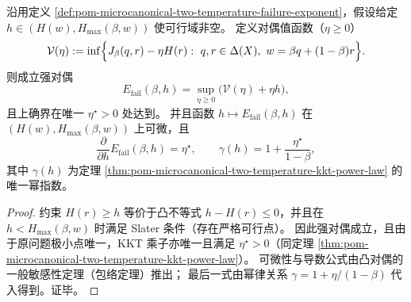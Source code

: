 \begin{theorem}\label{thm:pom-microcanonical-two-temperature-strong-duality-sensitivity}
沿用定义 \ref{def:pom-microcanonical-two-temperature-failure-exponent}，假设给定 \(h\in(H(w),H_{\max}(\beta,w))\) 使可行域非空。
定义对偶值函数（\(\eta\ge 0\)）
\[
\mathcal{V}(\eta):=\inf\Bigl\{J_\beta(q,r)-\eta H(r):\ q,r\in\Delta(X),\ w=\beta q+(1-\beta)r\Bigr\}.
\]
则成立强对偶
\[
E_{\mathrm{fail}}(\beta,h)=\sup_{\eta\ge 0}\bigl(\mathcal{V}(\eta)+\eta h\bigr),
\]
且上确界在唯一 \(\eta^\star>0\) 处达到。
并且函数 \(h\mapsto E_{\mathrm{fail}}(\beta,h)\) 在 \((H(w),H_{\max}(\beta,w))\) 上可微，且
\[
\frac{\partial}{\partial h}E_{\mathrm{fail}}(\beta,h)=\eta^\star,
\qquad
\gamma(h)=1+\frac{\eta^\star}{1-\beta},
\]
其中 \(\gamma(h)\) 为定理 \ref{thm:pom-microcanonical-two-temperature-kkt-power-law} 的唯一幂指数。
\end{theorem}
\begin{proof}
约束 \(H(r)\ge h\) 等价于凸不等式 \(h-H(r)\le 0\)，并且在 \(h< H_{\max}(\beta,w)\) 时满足 Slater 条件（存在严格可行点）。
因此强对偶成立，且由于原问题极小点唯一，KKT 乘子亦唯一且满足 \(\eta^\star>0\)（同定理 \ref{thm:pom-microcanonical-two-temperature-kkt-power-law}）。
可微性与导数公式由凸对偶的一般敏感性定理（包络定理）推出；
最后一式由幂律关系 \(\gamma=1+\eta/(1-\beta)\) 代入得到。证毕。
\end{proof}

